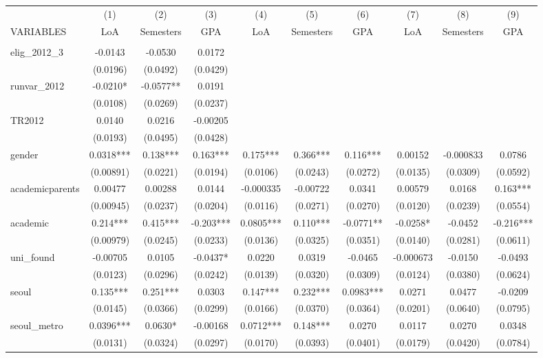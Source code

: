 \documentclass[]{article}
\begin{document}
\begin{tabular}{lccccccccc} \hline
 & (1) & (2) & (3) & (4) & (5) & (6) & (7) & (8) & (9) \\
VARIABLES & LoA & Semesters & GPA & LoA & Semesters & GPA & LoA & Semesters & GPA \\ \hline
 &  &  &  &  &  &  &  &  &  \\
elig\_2012\_3 & -0.0143 & -0.0530 & 0.0172 &  &  &  &  &  &  \\
 & (0.0196) & (0.0492) & (0.0429) &  &  &  &  &  &  \\
runvar\_2012 & -0.0210* & -0.0577** & 0.0191 &  &  &  &  &  &  \\
 & (0.0108) & (0.0269) & (0.0237) &  &  &  &  &  &  \\
TR2012 & 0.0140 & 0.0216 & -0.00205 &  &  &  &  &  &  \\
 & (0.0193) & (0.0495) & (0.0428) &  &  &  &  &  &  \\
gender & 0.0318*** & 0.138*** & 0.163*** & 0.175*** & 0.366*** & 0.116*** & 0.00152 & -0.000833 & 0.0786 \\
 & (0.00891) & (0.0221) & (0.0194) & (0.0106) & (0.0243) & (0.0272) & (0.0135) & (0.0309) & (0.0592) \\
academicparents & 0.00477 & 0.00288 & 0.0144 & -0.000335 & -0.00722 & 0.0341 & 0.00579 & 0.0168 & 0.163*** \\
 & (0.00945) & (0.0237) & (0.0204) & (0.0116) & (0.0271) & (0.0270) & (0.0120) & (0.0239) & (0.0554) \\
academic & 0.214*** & 0.415*** & -0.203*** & 0.0805*** & 0.110*** & -0.0771** & -0.0258* & -0.0452 & -0.216*** \\
 & (0.00979) & (0.0245) & (0.0233) & (0.0136) & (0.0325) & (0.0351) & (0.0140) & (0.0281) & (0.0611) \\
uni\_found & -0.00705 & 0.0105 & -0.0437* & 0.0220 & 0.0319 & -0.0465 & -0.000673 & -0.0150 & -0.0493 \\
 & (0.0123) & (0.0296) & (0.0242) & (0.0139) & (0.0320) & (0.0309) & (0.0124) & (0.0380) & (0.0624) \\
seoul & 0.135*** & 0.251*** & 0.0303 & 0.147*** & 0.232*** & 0.0983*** & 0.0271 & 0.0477 & -0.0209 \\
 & (0.0145) & (0.0366) & (0.0299) & (0.0166) & (0.0370) & (0.0364) & (0.0201) & (0.0640) & (0.0795) \\
seoul\_metro & 0.0396*** & 0.0630* & -0.00168 & 0.0712*** & 0.148*** & 0.0270 & 0.0117 & 0.0270 & 0.0348 \\
 & (0.0131) & (0.0324) & (0.0297) & (0.0170) & (0.0393) & (0.0401) & (0.0179) & (0.0420) & (0.0784) \\

\end{tabular}
\end{document}

